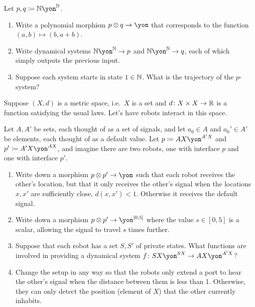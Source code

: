 \documentclass[DynamicalBook]{subfiles}
\begin{document}
\begin{exercise}
Let $p,q\coloneqq\nn\yon^\nn$.
\begin{enumerate}
	\item Write a polynomial morphism $p\otimes q\to\yon$ that corresponds to the function $(a,b)\mapsto (b,a+b)$.
	\item Write dynamical systems $\nn\yon^\nn\to p$ and $\nn\yon^\nn\to q$, each of which simply outputs the previous input.
	\item Suppose each system starts in state $1\in\mathbb{N}$. What is the trajectory of the $p$-system?
\qedhere
\end{enumerate}
\end{exercise}

\begin{exercise}
Suppose $(X,d)$ is a metric space, i.e.\ $X$ is a set and $d\colon X\times X\to\mathbb{R}$ is a function satisfying the usual laws. Let's have robots interact in this space.

Let $A,A'$ be sets, each thought of as a set of signals, and let $a_0\in A$ and $a_0'\in A'$ be elements, each thought of as a default value. Let $p\coloneqq AX\yon^{A'X}$ and $p'\coloneqq A'X\yon^{AX}$, and imagine there are two robots, one with interface $p$ and one with interface $p'$.
\begin{enumerate}
	\item Write down a morphism $p\otimes p'\to\yon$ such that each robot receives the other's location, but that it only receives the other's signal when the locations $x,x'$ are sufficiently close, $d(x,x')<1$. Otherwise it receives the default signal.
	\item Write down a morphism $p\otimes p'\to\yon^{[0,5]}$ where the value $s\in [0,5]$ is a scalar, allowing the signal to travel $s$ times further.
	\item Suppose that each robot has a set $S,S'$ of private states. What functions are involved in providing a dynamical system $f\colon SX\yon^{SX}\to AX\yon^{A'X}$?
	\item Change the setup in any way so that the robots only extend a port to hear the other's signal when the distance between them is less than 1. Otherwise, they can only detect the position (element of $X$) that the other currently inhabits.
\qedhere
\end{enumerate}
\end{exercise}
\end{document}
